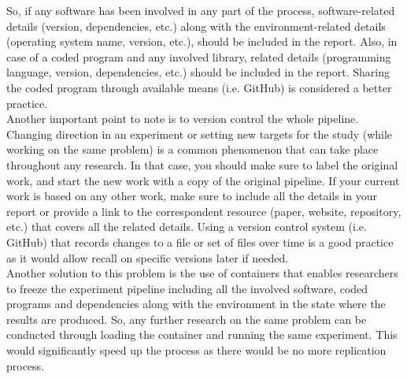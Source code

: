     So, if any software has been involved in any part of the process, software-related details (version, dependencies, etc.) along 
    with the environment-related details (operating system name, version, etc.), should be included in the report.
    Also, in case of a coded program and any involved library, related details (programming language, version, dependencies, etc.) 
    should be included in the report. Sharing the coded program through available means (i.e. GitHub) is considered a better practice.\\

    Another important point to note is to version control the whole pipeline. Changing direction in an experiment or setting new targets 
    for the study (while working on the same problem) is a common phenomenon that can take place throughout any research. 
    In that case, you should make sure to label the original work, and start the new work with a copy of the original pipeline. If your 
    current work is based on any other work, make sure to include all the details in your report or provide a link to the correspondent 
    resource (paper, website, repository, etc.) that covers all the related details. Using a version control system (i.e. GitHub) 
    that records changes to a file or set of files over time is a good practice as it would allow recall on specific versions 
    later if needed.\\
    

    Another solution to this problem is the use of containers that enables researchers to freeze the experiment pipeline including all
    the involved software, coded programs and dependencies along with the environment in the state where the results are produced. So, any 
    further research on the same problem can be conducted through loading the container and running the same experiment. This would 
    significantly speed up the process as there would be no more replication process.